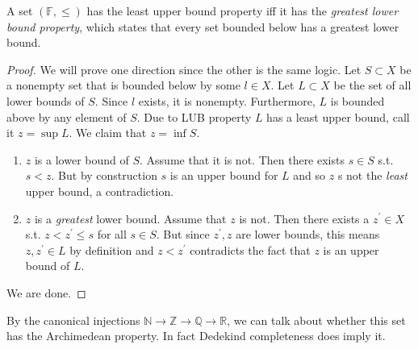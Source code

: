   \begin{theorem}
    A set $(\mathbb{F}, \leq)$ has the least upper bound property iff it has the \textit{greatest lower bound property}, which states that every set bounded below has a greatest lower bound. 
  \end{theorem}
  \begin{proof}
    We will prove one direction since the other is the same logic. Let $S \subset X$ be a nonempty set that is bounded below by some $l \in X$. Let $L \subset X$ be the set of all lower bounds of $S$. Since $l$ exists, it is nonempty. Furthermore, $L$ is bounded above by any element of $S$. Due to LUB property $L$ has a least upper bound, call it $z = \sup{L}$. We claim that $z = \inf{S}$. 
    \begin{enumerate}
      \item $z$ is a lower bound of $S$. Assume that it is not. Then there exists $s \in S$ s.t. $s < z$. But by construction $s$ is an upper bound for $L$ and so $z$ s not the \textit{least} upper bound, a contradiction. 
      \item $z$ is a \textit{greatest} lower bound. Assume that $z$ is not. Then there exists a $z^\prime \in X$ s.t. $z < z^\prime \leq s$ for all $s \in S$. But since $z^\prime, z$ are lower bounds, this means $z, z^\prime \in L$ by definition and $z < z^\prime$ contradicts the fact that $z$ is an upper bound of $L$. 
    \end{enumerate}
    We are done. 
  \end{proof}

  By the canonical injections $\mathbb{N} \rightarrow \mathbb{Z} \rightarrow \mathbb{Q} \rightarrow \mathbb{R}$, we can talk about whether this set has the Archimedean property. In fact Dedekind completeness does imply it. 

